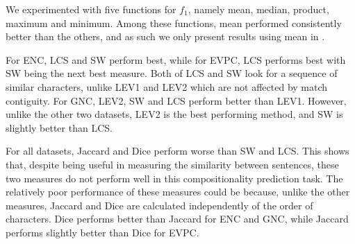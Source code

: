 \documentclass[output=paper
,modfonts
,nonflat]{langsci/langscibook}
\begin{document}
We experimented with five functions for $f_1$, namely mean, median,
product, maximum and minimum. Among these functions, mean performed
consistently better than the others, and as such we only present results
using mean in .



For ENC, LCS and SW perform best, while for EVPC, LCS performs best
with SW being the next best measure. Both of LCS and
SW look for a sequence of similar characters, unlike LEV1 and LEV2
which are not affected by match contiguity. For GNC, LEV2, SW and LCS
perform better than LEV1. However, unlike the other two datasets, LEV2
is the best performing method, and SW is slightly better than LCS.

For all datasets, Jaccard and Dice perform worse than SW and LCS. This
shows that, despite being useful in measuring the similarity between
sentences, these two measures do not perform well in this
compositionality prediction task. The relatively poor performance of
these measures could be because, unlike the other measures, Jaccard and
Dice are calculated independently of the order of characters. Dice
performs better than Jaccard for ENC and GNC, while Jaccard performs
slightly better than Dice for EVPC. 
\end{document}
